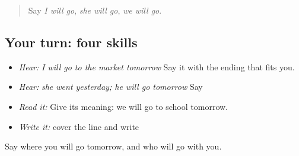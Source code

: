 \label{lesson:PA-C221-payoff}



\begin{quote}
Say \emph{I will go}, \emph{she will go}, \emph{we will go}.
\end{quote}

\subsection*{Your turn: four skills}
\begin{itemize}
\raggedright
  \item \emph{Hear:} \emph{I will go to the market tomorrow} Say it with the ending that fits you.
  \item \emph{Hear:} \emph{she went yesterday; he will go tomorrow} Say \textbf{     }
  \item \emph{Read it:} \textbf{   } Give its meaning: we will go to school tomorrow.
  \item \emph{Write it:} cover the line and write \textbf{   }
\end{itemize}

\begin{tcolorbox}[breakable,colback=teal!4,colframe=teal!35!black,title={Before you move on}]
Say where you will go tomorrow, and who will go with you.
\end{tcolorbox}
